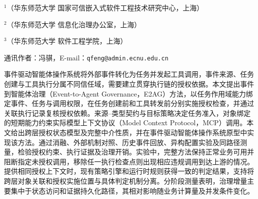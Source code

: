 \thispagestyle{josfirst}


\vspace{7pt}

\vspace{4pt}
\begingroup\fontsize{8pt}{12pt}\selectfont
\noindent$^{1}$（华东师范大学 国家可信嵌入式软件工程技术研究中心，上海）\par
\noindent$^{2}$（华东师范大学 信息化治理办公室，上海）\par
\noindent$^{3}$（华东师范大学 软件工程学院，上海）\par
\noindent 通讯作者：冯骐，E-mail：\texttt{qfeng@admin.ecnu.edu.cn}\par
\endgroup

\begin{joszhabstract}
事件驱动智能体操作系统将外部事件转化为任务并发起工具调用，事件来源、任务创建与工具执行分属不同信任域，需要建立贯穿执行链的授权依据。本文提出事件到智能体治理（Event-to-Agent Governance，E2AG）方法，以任务作用域能力绑定事件、任务与调用权限，在任务创建前和工具转发前分别实施授权检查，并通过关联执行记录复核授权依赖。来源--类型契约与目标策略决定任务准入，对象绑定的短期能力约束实际模型上下文协议（Model Context Protocol，MCP）调用。本文给出跨层授权状态模型及完整中介性质，并在事件驱动智能体操作系统原型中实现该方法。通过消融、外部机制对照、历史事件回放、异构配置实验及同路径测量，检验授权约束、执行证据及治理开销。实验中，完整方法保持正常业务可用并阻断指定未授权调用，移除任一执行检查点则出现相应违规调用到达上游的情况。提供相同授权上下文时，现有策略引擎和运行时规则获得一致的判定结果，支持将跨层对象关联和授权实施位置与具体判定机制分离。分阶段测量表明，治理增量主要集中于状态访问和证据持久化路径，其相对影响随业务计算量及并发条件变化。
\end{joszhabstract}

